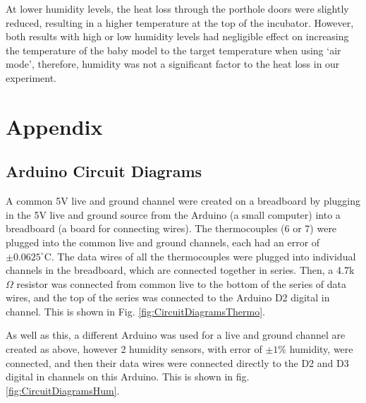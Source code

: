 \documentclass{article}
\begin{document}
\vspace{3mm}

At lower humidity levels, the heat loss through the porthole doors were slightly reduced, resulting in a higher temperature at the top of the incubator. However, both results with high or low humidity levels had negligible effect on increasing the temperature of the baby model to the target temperature when using ‘air mode’, therefore, humidity was not a significant factor to the heat loss in our experiment.


\printbibliography

\newpage

\section{Appendix}

\subsection{Arduino Circuit Diagrams}


A common 5V live and ground channel were created on a breadboard by  plugging in the 5V live and ground source from the Arduino (a small computer) into a breadboard (a board for connecting wires). The thermocouples (6 or 7) were plugged into the common live and ground channels, each had an error of $\pm0.0625^{\circ}$C. The data wires of all the thermocouples were plugged into individual channels in the breadboard, which are connected together in series. Then, a 4.7k$\Omega$ resistor was connected from common live to the bottom of the series of data wires, and the top of the series was connected to the Arduino D2 digital in channel. This is shown in Fig. \ref{fig:CircuitDiagramsThermo}.

\vspace{3mm}

As well as this, a different Arduino was used for a live and ground channel are created as above, however 2 humidity sensors, with error of $\pm1\%$ humidity, were connected, and then their data wires were connected directly to the D2 and D3 digital in channels on this Arduino. This is shown in fig. \ref{fig:CircuitDiagramsHum}.
\end{document}
